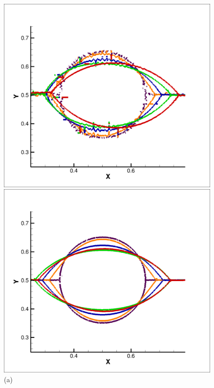 \documentclass[preprint,12pt]{Definitions/elsarticle}
\begin{document}
\begin{figure}[H]
	\begin{minipage}[]{.49\linewidth}
		\centering
		\includegraphics[width=1\textwidth]{MOF_NOTRUNCATE_LENS.png} 
		\caption*{(a)}
	\end{minipage}
	\begin{minipage}[]{.49\linewidth}
		\centering
		\includegraphics[width=1\textwidth]{CMOF_NOTRUNCATE_LENS.png} 

\end{minipage}
\end{figure}
\end{document}
